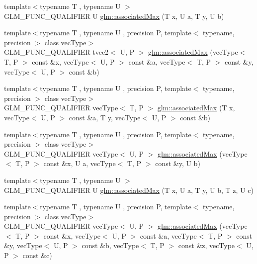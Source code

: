\begin{DoxyCompactItemize}
\item 
{\footnotesize template$<$typename T , typename U $>$ }\\G\+L\+M\+\_\+\+F\+U\+N\+C\+\_\+\+Q\+U\+A\+L\+I\+F\+I\+ER U \hyperlink{group__gtx__associated__min__max_ga7d9c8785230c8db60f72ec8975f1ba45}{glm\+::associated\+Max} (T x, U a, T y, U b)
\item 
{\footnotesize template$<$typename T , typename U , precision P, template$<$ typename, precision $>$ class vec\+Type$>$ }\\G\+L\+M\+\_\+\+F\+U\+N\+C\+\_\+\+Q\+U\+A\+L\+I\+F\+I\+ER tvec2$<$ U, P $>$ \hyperlink{group__gtx__associated__min__max_ga10ba6001798f42a0f941f19ff30e066a}{glm\+::associated\+Max} (vec\+Type$<$ T, P $>$ const \&x, vec\+Type$<$ U, P $>$ const \&a, vec\+Type$<$ T, P $>$ const \&y, vec\+Type$<$ U, P $>$ const \&b)
\item 
{\footnotesize template$<$typename T , typename U , precision P, template$<$ typename, precision $>$ class vec\+Type$>$ }\\G\+L\+M\+\_\+\+F\+U\+N\+C\+\_\+\+Q\+U\+A\+L\+I\+F\+I\+ER vec\+Type$<$ T, P $>$ \hyperlink{group__gtx__associated__min__max_ga62ca63cca6b21387b8a25474f441a869}{glm\+::associated\+Max} (T x, vec\+Type$<$ U, P $>$ const \&a, T y, vec\+Type$<$ U, P $>$ const \&b)
\item 
{\footnotesize template$<$typename T , typename U , precision P, template$<$ typename, precision $>$ class vec\+Type$>$ }\\G\+L\+M\+\_\+\+F\+U\+N\+C\+\_\+\+Q\+U\+A\+L\+I\+F\+I\+ER vec\+Type$<$ U, P $>$ \hyperlink{group__gtx__associated__min__max_ga5364520173815b66a9d9e452c38bf312}{glm\+::associated\+Max} (vec\+Type$<$ T, P $>$ const \&x, U a, vec\+Type$<$ T, P $>$ const \&y, U b)
\item 
{\footnotesize template$<$typename T , typename U $>$ }\\G\+L\+M\+\_\+\+F\+U\+N\+C\+\_\+\+Q\+U\+A\+L\+I\+F\+I\+ER U \hyperlink{group__gtx__associated__min__max_gaec891e363d91abbf3a4443cf2f652209}{glm\+::associated\+Max} (T x, U a, T y, U b, T z, U c)
\item 
{\footnotesize template$<$typename T , typename U , precision P, template$<$ typename, precision $>$ class vec\+Type$>$ }\\G\+L\+M\+\_\+\+F\+U\+N\+C\+\_\+\+Q\+U\+A\+L\+I\+F\+I\+ER vec\+Type$<$ U, P $>$ \hyperlink{group__gtx__associated__min__max_ga065a0c1eb7837118ef79be88dfd78487}{glm\+::associated\+Max} (vec\+Type$<$ T, P $>$ const \&x, vec\+Type$<$ U, P $>$ const \&a, vec\+Type$<$ T, P $>$ const \&y, vec\+Type$<$ U, P $>$ const \&b, vec\+Type$<$ T, P $>$ const \&z, vec\+Type$<$ U, P $>$ const \&c)

\end{DoxyCompactItemize}
